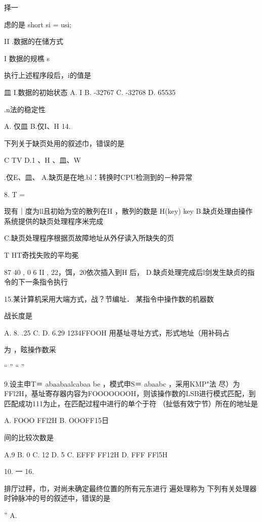     择一

  虑的是    short si = usi;

    II .数据的在储方式

   I 数据的规樵    s

    执行上述程序段后，i的值是

   皿    I.数据的初始状态    A. I     B. -32767    C. -32768    D. 65535

    .n法的稳定性

   A. 仅皿    B.仅I、H    14.

    下列关于缺页处用的叙述巾，错误的是

  C    TV    D.1 、H 、皿、W

    .仅E、皿、    A.缺页是在地.bl：转换时CPU检测到的－种异常

8.    T    =

   现有｜度为ll且初始为空的散列在H ，散列的数是 H(key)  key    B.缺贞处理由操作系统提供的缺页处理程序米完成


    C.缺页处理程序根据页故障地址从外仔读入所缺失的页

    T    HT奇找失败的平均冕

   87  40 , 0  6  II , 22，饵，20依次插入到H 后，    D.缺贞处理完成后l剑发生缺贞的指令的下一条指令执行

    15.某计算机采用大端方式，战？节编址． 某指令中操作数的机器数

   战长度是

   A.      8. .25     C.      D. 6.29    1234FFOOH    用基址寻址方式，形式地址（用补码占

    为    ，眩操作数采

    “    ”    “    ”

9.设主申T＝ abaabaalcabaa be ，模式申S＝ abaabc ，采用KMP"法    尽）为FFl2H，基址寄存器内容为FOOOOOOOH，则该操作数的LSB进行模式匹配，到匹配成功111为止，在匹配过程中进行的单个于符    （扯低有效宁节）所在的地址是

    A. FOOO FFl2H     B. OOOFF15日

   间的比较次数是

   A.9    B. 0     C. 12    D. 5     C. EFFF FF12H     D. FFF FFl5H

10.    一    16.

    排厅过秤，巾，对尚未确定最终位置的所有元东进行  遍处理称为    下列有关处理器时钟脉冲的号的叙述中，错误的是

    ”    A.


